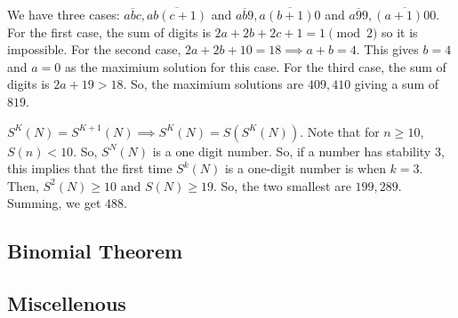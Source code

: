 \documentclass[11pt]{article}
\begin{document}
\begin{sol}
We have three cases: $\overline{abc}, \overline{ab(c+1)}$ and $\overline{ab9}, \overline{a(b+1)0}$ and $\overline{a99}, \overline{(a+1)00}$. For the first case, the sum of digits is $2a+2b+2c+1=1\pmod{2}$ so it is impossible. For the second case, $2a+2b+10=18\implies a+b=4$. This gives $b=4$ and $a=0$ as the maximium solution for this case. For the third case, the sum of digits is $2a+19>18$. So, the maximium solutions are $409,410$ giving a sum of $\boxed{819}$.
\end{sol}


\begin{sol} 
$S^{K}(N)=S^{K+1}(N)\implies S^{K}(N)=S(S^{K}(N))$. Note that for $n\ge 10$, $S(n) <10$. So, $S^{N}(N)$ is a one digit number. So, if a number has stability $3$, this implies that the first time $S^{k}(N)$ is a one-digit number is when $k=3$. Then, $S^{2}(N)\ge 10$ and $S(N)\ge 19$. So, the two smallest are $199,289$. Summing, we get $\boxed{488}$.
\end{sol}

\subsection{Binomial Theorem}

\subsection{Miscellenous}
\end{document}
